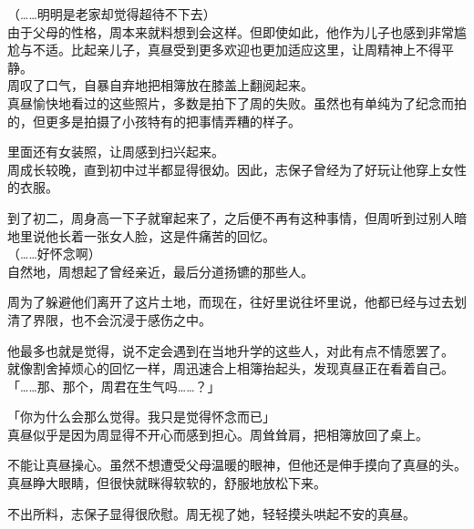 （……明明是老家却觉得超待不下去）\\

由于父母的性格，周本来就料想到会这样。但即使如此，他作为儿子也感到非常尴尬与不适。比起亲儿子，真昼受到更多欢迎也更加适应这里，让周精神上不得平静。\\

周叹了口气，自暴自弃地把相簿放在膝盖上翻阅起来。\\

真昼愉快地看过的这些照片，多数是拍下了周的失败。虽然也有单纯为了纪念而拍的，但更多是拍摄了小孩特有的把事情弄糟的样子。

里面还有女装照，让周感到扫兴起来。\\

周成长较晚，直到初中过半都显得很幼。因此，志保子曾经为了好玩让他穿上女性的衣服。

到了初二，周身高一下子就窜起来了，之后便不再有这种事情，但周听到过别人暗地里说他长着一张女人脸，这是件痛苦的回忆。\\

（……好怀念啊）\\

自然地，周想起了曾经亲近，最后分道扬镳的那些人。

周为了躲避他们离开了这片土地，而现在，往好里说往坏里说，他都已经与过去划清了界限，也不会沉浸于感伤之中。

他最多也就是觉得，说不定会遇到在当地升学的这些人，对此有点不情愿罢了。\\

就像割舍掉烦心的回忆一样，周迅速合上相簿抬起头，发现真昼正在看着自己。\\

「……那、那个，周君在生气吗……？」

「你为什么会那么觉得。我只是觉得怀念而已」\\

真昼似乎是因为周显得不开心而感到担心。周耸耸肩，把相簿放回了桌上。

不能让真昼操心。虽然不想遭受父母温暖的眼神，但他还是伸手摸向了真昼的头。\\

真昼睁大眼睛，但很快就眯得软软的，舒服地放松下来。

不出所料，志保子显得很欣慰。周无视了她，轻轻摸头哄起不安的真昼。
